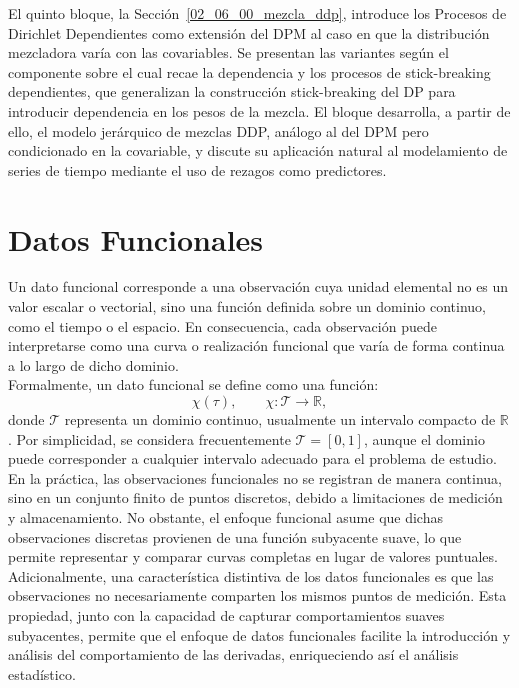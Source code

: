 El quinto bloque, la Sección~\ref{02_06_00_mezcla_ddp}, introduce los Procesos de Dirichlet Dependientes como extensión del DPM al caso en que la distribución mezcladora varía con las covariables. Se presentan las variantes según el componente sobre el cual recae la dependencia y los procesos de stick-breaking dependientes, que generalizan la construcción stick-breaking del DP para introducir dependencia en los pesos de la mezcla. El bloque desarrolla, a partir de ello, el modelo jerárquico de mezclas DDP, análogo al del DPM pero condicionado en la covariable, y discute su aplicación natural al modelamiento de series de tiempo mediante el uso de rezagos como predictores.

\section{Datos Funcionales}
\label{02_01_00_datos_funcionales}
Un dato funcional corresponde a una observación cuya unidad elemental no es un valor escalar o vectorial, sino una función definida sobre un dominio continuo, como el tiempo o el espacio. En consecuencia, cada observación puede interpretarse como una curva o realización funcional que varía de forma continua a lo largo de dicho dominio.\\

Formalmente, un dato funcional se define como una función:
\begin{equation}
    \chi(\tau), \qquad \chi:\mathcal{T}\rightarrow\mathbb{R},
\end{equation}
donde $\mathcal{T}$ representa un dominio continuo, usualmente un intervalo compacto de $\mathbb{R}$. Por simplicidad, se considera frecuentemente $\mathcal{T}=[0,1]$, aunque el dominio puede corresponder a cualquier intervalo adecuado para el problema de estudio.\\

En la práctica, las observaciones funcionales no se registran de manera continua, sino en un conjunto finito de puntos discretos, debido a limitaciones de medición y almacenamiento. No obstante, el enfoque funcional asume que dichas observaciones discretas provienen de una función subyacente suave, lo que permite representar y comparar curvas completas en lugar de valores puntuales.\\

Adicionalmente, una característica distintiva de los datos funcionales es que las observaciones no necesariamente comparten los mismos puntos de medición. Esta propiedad, junto con la capacidad de capturar comportamientos suaves subyacentes, permite que el enfoque de datos funcionales facilite la introducción y análisis del comportamiento de las derivadas, enriqueciendo así el análisis estadístico.

